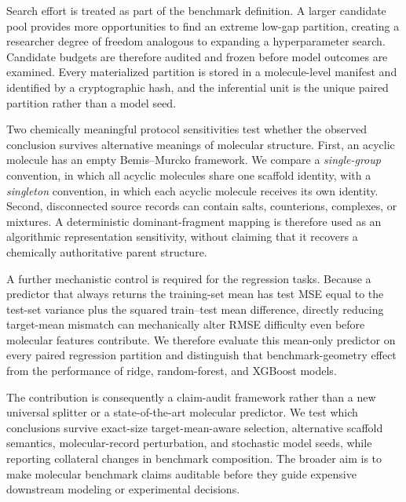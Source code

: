 Search effort is treated as part of the benchmark definition. A larger candidate pool provides more opportunities to find an extreme low-gap partition, creating a researcher degree of freedom analogous to expanding a hyperparameter search. Candidate budgets are therefore audited and frozen before model outcomes are examined. Every materialized partition is stored in a molecule-level manifest and identified by a cryptographic hash, and the inferential unit is the unique paired partition rather than a model seed.

Two chemically meaningful protocol sensitivities test whether the observed conclusion survives alternative meanings of molecular structure. First, an acyclic molecule has an empty Bemis--Murcko framework. We compare a \emph{single-group} convention, in which all acyclic molecules share one scaffold identity, with a \emph{singleton} convention, in which each acyclic molecule receives its own identity. Second, disconnected source records can contain salts, counterions, complexes, or mixtures. A deterministic dominant-fragment mapping is therefore used as an algorithmic representation sensitivity, without claiming that it recovers a chemically authoritative parent structure.

A further mechanistic control is required for the regression tasks. Because a predictor that always returns the training-set mean has test MSE equal to the test-set variance plus the squared train--test mean difference, directly reducing target-mean mismatch can mechanically alter RMSE difficulty even before molecular features contribute. We therefore evaluate this mean-only predictor on every paired regression partition and distinguish that benchmark-geometry effect from the performance of ridge, random-forest, and XGBoost models.

The contribution is consequently a claim-audit framework rather than a new universal splitter or a state-of-the-art molecular predictor. We test which conclusions survive exact-size target-mean-aware selection, alternative scaffold semantics, molecular-record perturbation, and stochastic model seeds, while reporting collateral changes in benchmark composition. The broader aim is to make molecular benchmark claims auditable before they guide expensive downstream modeling or experimental decisions.
